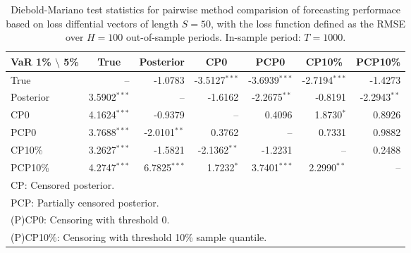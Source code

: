 { \renewcommand{\arraystretch}{1.2} 
\begin{table} 
\center 
\begin{tabular}{l | rrr rrr} 
VaR 1\% $\setminus$ 5\% & \multicolumn{1}{c}{True} & \multicolumn{1}{c}{Posterior} & \multicolumn{1}{c}{CP0} & \multicolumn{1}{c}{PCP0} & \multicolumn{1}{c}{CP10\%} & \multicolumn{1}{c}{PCP10\%} \\ \hline 
True &    --\phantom{$^{***}$} & -1.0783\phantom{$^{***}$} & -3.5127$^{***}$ & -3.6939$^{***}$ & -2.7194$^{***}$ & -1.4273\phantom{$^{***}$}  \\ 
Posterior & 3.5902$^{***}$ &    --\phantom{$^{***}$} & -1.6162\phantom{$^{***}$} & -2.2675$^{**}$\phantom{$^{*}$} & -0.8191\phantom{$^{***}$} & -2.2943$^{**}$\phantom{$^{*}$}  \\ 
CP0 & 4.1624$^{***}$ & -0.9379\phantom{$^{***}$} &    --\phantom{$^{***}$} & 0.4096\phantom{$^{***}$} & 1.8730$^{*}$\phantom{$^{**}$} & 0.8926\phantom{$^{***}$}  \\ 
PCP0 & 3.7688$^{***}$ & -2.0101$^{**}$\phantom{$^{*}$} & 0.3762\phantom{$^{***}$} &    --\phantom{$^{***}$} & 0.7331\phantom{$^{***}$} & 0.9882\phantom{$^{***}$}  \\ 
CP10\% & 3.2627$^{***}$ & -1.5821\phantom{$^{***}$} & -2.1362$^{**}$\phantom{$^{*}$} & -1.2231\phantom{$^{***}$} &    --\phantom{$^{***}$} & 0.2488\phantom{$^{***}$}  \\ 
PCP10\% & 4.2747$^{***}$ & 6.7825$^{***}$ & 1.7232$^{*}$\phantom{$^{**}$} & 3.7401$^{***}$ & 2.2990$^{**}$\phantom{$^{*}$} &    --\phantom{$^{***}$}  \\ 
\hline 
\multicolumn{7}{l}{\footnotesize{CP: Censored posterior.}}  \\ 
\multicolumn{7}{l}{\footnotesize{PCP: Partially censored posterior.}} \\ 
\multicolumn{7}{l}{\footnotesize{(P)CP0: Censoring with threshold 0.}} \\ 
\multicolumn{7}{l}{\footnotesize{(P)CP10\%: Censoring with threshold 10\% sample quantile.}}  \\ 
\end{tabular}
 \caption{Diebold-Mariano test statistics for  pairwise method comparision of forecasting performace based on loss diffential vectors of length $S = 50$, with the loss function defined as the RMSE over $H=100$ out-of-sample periods. In-sample period: $T = 1000$.} 
\label{tab:garch11_v2_DM_T_1000}  
\end{table}
}